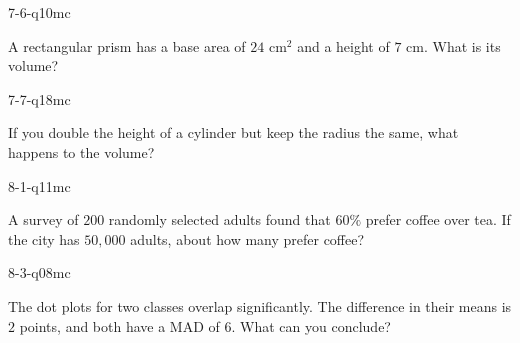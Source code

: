 \begin{practiceQuestion}{7-6-q10}{mc}
\begin{questionText}
A rectangular prism has a base area of $24$ cm$^2$ and a height of $7$ cm. What is its volume?
\end{questionText}
\end{practiceQuestion}

\begin{practiceQuestion}{7-7-q18}{mc}
\begin{questionText}
If you double the height of a cylinder but keep the radius the same, what happens to the volume?
\end{questionText}
\end{practiceQuestion}

\begin{practiceQuestion}{8-1-q11}{mc}
\begin{questionText}
A survey of $200$ randomly selected adults found that $60\%$ prefer coffee over tea. If the city has $50{,}000$ adults, about how many prefer coffee?
\end{questionText}
\end{practiceQuestion}

\begin{practiceQuestion}{8-3-q08}{mc}
\begin{questionText}
The dot plots for two classes overlap significantly. The difference in their means is $2$ points, and both have a MAD of $6$. What can you conclude?
\end{questionText}
\end{practiceQuestion}

